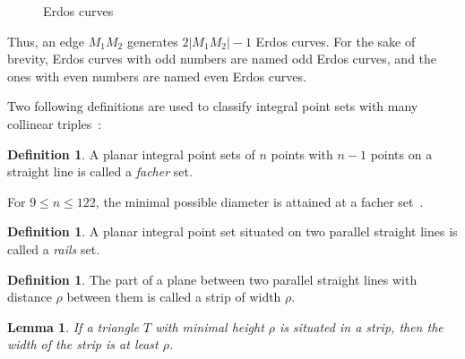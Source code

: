 \documentclass[a4paper,14pt]{article} %
\theoremstyle{plain}
\newtheorem{lemma}[theorem]{Lemma}
\theoremstyle{definition}
\newtheorem{definition}[theorem]{Definition}
\begin{document}
\begin{figure}
\caption{Erdos curves}
\label{fig:Erdos_curves_numbered}
\end{figure}

Thus, an edge $M_1 M_2$ generates $2|M_1 M_2| - 1$ Erdos curves.
For the sake of brevity, Erdos curves with odd numbers are named odd Erdos curves,
and the ones with even numbers are named even Erdos curves.

Two following definitions are used to classify integral point sets
with many collinear triples~\cite{avdeev2019particular}:

\begin{definition}
	A planar integral point sets of $n$ points with $n-1$ points on a straight line is called
	a \emph{facher} set.
\end{definition}
For $9\leq n\leq 122$, the minimal possible diameter is attained at a facher set~\cite{kurz2008bounds}.

\begin{definition}
	A planar integral point set situated on two parallel straight lines
	is called a \emph{rails} set.
\end{definition}


\begin{definition}
	The part of a plane between two parallel straight lines with distance $\rho$ between them
	is called a strip of width $\rho$.
\end{definition}

\begin{lemma}
	\cite{smurov1998stripcoverings}
	\label{lem:smurov_min_height}
	If a triangle $T$ with minimal height $\rho$ is situated in a strip,
	then the width of the strip is at least $\rho$.
\end{lemma}
\end{document}
